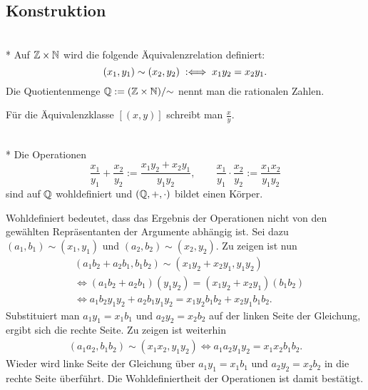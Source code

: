 \subsection{Konstruktion}

\begin{Definition}\mbox{}\\*
Auf $\mathbb Z\times\mathbb N$ wird die folgende Äquivalenzrelation definiert:
\[(x_1,y_1)\sim (x_2,y_2) \;:\Longleftrightarrow\; x_1y_2 = x_2y_1.\]
Die Quotientenmenge $\mathbb Q := (\mathbb Z\times\mathbb N)/{\sim}$ nennt man
die rationalen Zahlen.
\end{Definition}
Für die Äquivalenzklasse $[(x,y)]$ schreibt man $\frac{x}{y}$.

\begin{Satz}\mbox{}\\*
Die Operationen
\[\frac{x_1}{y_1}+\frac{x_2}{y_2} := \frac{x_1y_2+x_2y_1}{y_1y_2},
\qquad\frac{x_1}{y_1}\cdot \frac{x_2}{y_2} := \frac{x_1x_2}{y_1y_2}\]
sind auf $\mathbb Q$ wohldefiniert und $(\mathbb Q,+,\cdot)$ bildet einen Körper.
\end{Satz}
 Wohldefiniert bedeutet, dass das Ergebnis der
Operationen nicht von den gewählten Repräsentanten der Argumente
abhängig ist. Sei dazu $(a_1,b_1)\sim (x_1,y_1)$ und
$(a_2,b_2)\sim (x_2,y_2)$. Zu zeigen ist nun
\begin{align*}
&(a_1b_2+a_2b_1,b_1b_2)\sim (x_1y_2+x_2y_1,y_1y_2)\\
&\iff (a_1b_2+a_2b_1)(y_1y_2) = (x_1y_2+x_2y_1)(b_1b_2)\\
&\iff a_1b_2 y_1y_2 + a_2b_1y_1y_2 = x_1y_2b_1b_2+x_2y_1b_1b_2.
\end{align*}
Substituiert man $a_1y_1=x_1b_1$ und $a_2y_2=x_2b_2$ auf
der linken Seite der Gleichung, ergibt sich die rechte Seite.
Zu zeigen ist weiterhin
\begin{align*}
(a_1a_2,b_1b_2)\sim (x_1x_2,y_1y_2)
\iff a_1a_2y_1y_2 = x_1x_2b_1b_2.
\end{align*}
Wieder wird linke Seite der Gleichung über $a_1y_1=x_1b_1$
und $a_2y_2=x_2b_2$ in die rechte Seite überführt.
Die Wohldefiniertheit der Operationen ist damit bestätigt.

